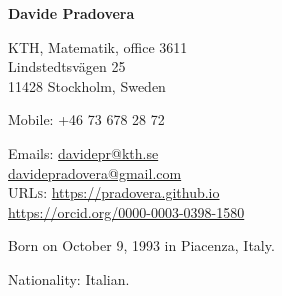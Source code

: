 \documentclass[11pt]{article} %
\begin{document}

\begin{minipage}[c]{.75\textwidth}
{\huge\bfseries Davide Pradovera} %
\bigskip\bigskip\medskip %

KTH, Matematik, office 3611 \\
Lindstedtsv\"agen 25 \\
11428 Stockholm, Sweden
\medskip %

Mobile: +46 73 678 28 72 %
\medskip %

Emails: \href{mailto:davidepr@kth.se}{davidepr@kth.se}\\ %
\phantom{Emails: }\href{mailto:davidepradovera@gmail.com}{davidepradovera@gmail.com}\\ %
\textsc{URLs}: \href{https://pradovera.github.io}{https://pradovera.github.io}\\ %
\href{https://orcid.org/0000-0003-0398-1580}{https://orcid.org/0000-0003-0398-1580}\\ %
\end{minipage}\hfill%
\begin{minipage}[c]{.225\textwidth}
\end{minipage}\hfill%

\smallskip %


Born on October 9, 1993 in Piacenza, Italy. %

Nationality: Italian. %

\end{document}
